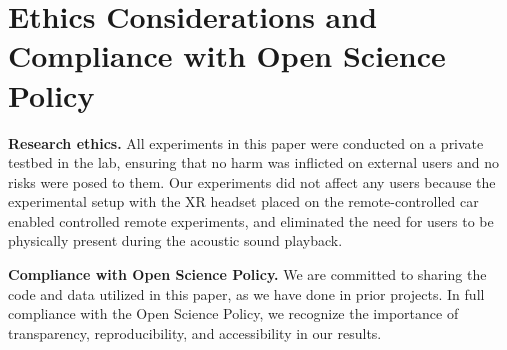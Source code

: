 \section{Ethics Considerations and Compliance with Open Science Policy}
\label{sec:ethics}

\noindent \textbf{Research ethics.} All experiments in this paper were conducted on a private testbed in the lab, ensuring that no harm was inflicted on external users and no risks were posed to them. Our experiments did not affect any users because the experimental setup with the XR headset placed on the remote-controlled car enabled controlled remote experiments, and eliminated the need for users to be physically present during the acoustic sound playback.




\noindent \textbf{Compliance with Open Science Policy.} 
We are committed to sharing the code and data utilized in this paper, as we have done in prior projects. In full compliance with the Open Science Policy, we recognize the importance of transparency, reproducibility, and accessibility in our results.

